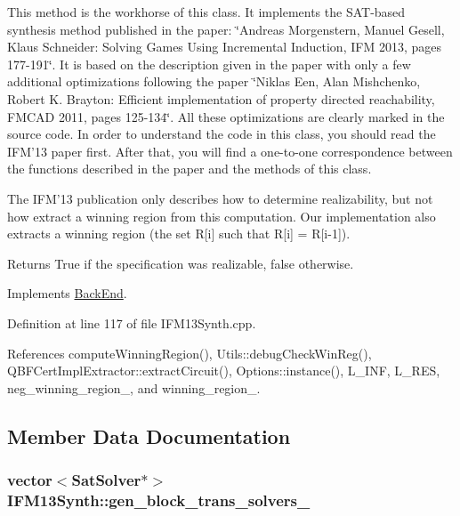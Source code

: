 This method is the workhorse of this class. It implements the S\-A\-T-\/based synthesis method published in the paper\-: \char`\"{}\-Andreas Morgenstern, Manuel Gesell, Klaus Schneider\-: Solving
\-Games Using Incremental Induction, I\-F\-M 2013, pages 177-\/191\char`\"{}. It is based on the description given in the paper with only a few additional optimizations following the paper \char`\"{}\-Niklas Een, Alan Mishchenko, Robert K. Brayton\-: Efficient implementation of
property directed reachability, F\-M\-C\-A\-D 2011, pages 125-\/134\char`\"{}. All these optimizations are clearly marked in the source code. In order to understand the code in this class, you should read the I\-F\-M'13 paper first. After that, you will find a one-\/to-\/one correspondence between the functions described in the paper and the methods of this class.

The I\-F\-M'13 publication only describes how to determine realizability, but not how extract a winning region from this computation. Our implementation also extracts a winning region (the set R\mbox{[}i\mbox{]} such that R\mbox{[}i\mbox{]} = R\mbox{[}i-\/1\mbox{]}).

\begin{DoxyReturn}{Returns}
True if the specification was realizable, false otherwise. 
\end{DoxyReturn}


Implements \hyperlink{classBackEnd_a099e717dc71e9cc2d838b1ca86340590}{Back\-End}.



Definition at line 117 of file I\-F\-M13\-Synth.\-cpp.



References compute\-Winning\-Region(), Utils\-::debug\-Check\-Win\-Reg(), Q\-B\-F\-Cert\-Impl\-Extractor\-::extract\-Circuit(), Options\-::instance(), L\-\_\-\-I\-N\-F, L\-\_\-\-R\-E\-S, neg\-\_\-winning\-\_\-region\-\_\-, and winning\-\_\-region\-\_\-.



\subsection{Member Data Documentation}
\hypertarget{classIFM13Synth_a950a68d4f0efeca411ead2d4439aed9d}{
\subsubsection[{gen\-\_\-block\-\_\-trans\-\_\-solvers\-\_\-}]{\setlength{\rightskip}{0pt plus 5cm}vector$<${\bf Sat\-Solver}$\ast$$>$ I\-F\-M13\-Synth\-::gen\-\_\-block\-\_\-trans\-\_\-solvers\-\_\-\hspace{0.3cm}{\ttfamily [protected]}}}\label{classIFM13Synth_a950a68d4f0efeca411ead2d4439aed9d}


